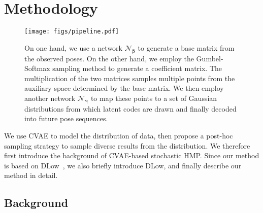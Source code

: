 \documentclass[sigconf,screen,nonacm]{acmart}
\begin{document}
	\section{Methodology}
	\begin{figure*}[!t]
		\centering
		\texttt{[image: figs/pipeline.pdf]}
		\caption{On one hand, we use a network $\mathcal{N}_{\bm{\beta}}$ to generate a base matrix from the observed poses. On the other hand, we employ the Gumbel-Softmax sampling method to generate a coefficient matrix. The multiplication of the two matrices samples multiple points from the auxiliary space determined by the base matrix. We then employ another network $\mathcal{N}_{\bm{\gamma}}$ to map these points to a set of Gaussian distributions from which latent codes are drawn and finally decoded into future pose sequences.}
		\label{fig:pipeline}
	\end{figure*}
	
	We use CVAE to model the distribution of data, then propose a post-hoc sampling strategy to sample diverse results from the distribution. We therefore first introduce the background of CVAE-based stochastic HMP. Since our method is based on DLow~\cite{yuan2020dlow}, we also briefly introduce DLow, and finally describe our method in detail.
	
	\subsection{Background}
	
\end{document}
